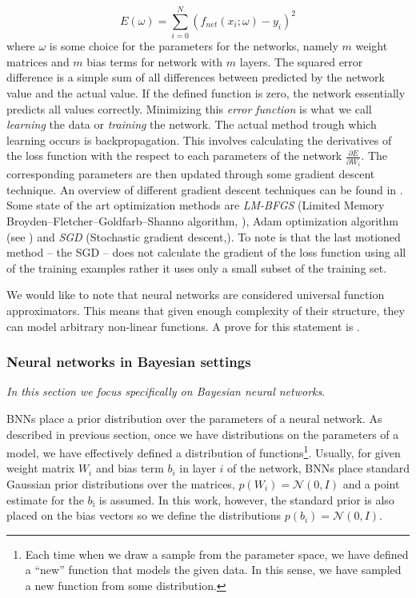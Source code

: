 \documentclass[12pt,a4paper,twoside]{scrartcl}
\numberwithin{equation}{section}
\begin{document}
\begin{equation}
 E(\omega) =  \sum_{i=0}^N (f_{net}(x_i;\omega) - y_i)^2
\end{equation}
where \(\omega\) is some choice for the parameters for the networks, namely \(m\) weight matrices and \(m\) bias terms for network with \(m\) layers. The squared error difference is a simple sum of all differences between predicted by the network value and the actual value. If the defined function is zero, the network essentially predicts all values correctly. Minimizing this \emph{error function} is what we call \emph{learning} the data or \emph{training} the network. The actual method trough which learning occurs is backpropagation. This involves calculating the derivatives of the loss function with the respect to each parameters of the network \(\frac{\partial E}{\partial W_i }\). The corresponding parameters are then updated through some gradient descent technique. An overview of different gradient descent techniques can be found in \cite{ruder2016}. Some state of the art optimization methods are \emph{LM-BFGS} (Limited Memory Broyden–Fletcher–Goldfarb–Shanno algorithm, \cite{byrd1995}), Adam optimization algorithm (see \cite{kingma2014}) and \emph{SGD} (Stochastic gradient descent,\cite{robbins1951}). To note is that the last motioned method -- the SGD -- does not calculate the gradient of the loss function using all of the training examples rather it uses only a small subset of the training set.

We would like to note that neural networks are considered universal function approximators. This means that given enough complexity of their structure, they can model arbitrary non-linear functions. A prove for this statement is \cite{hornik1989}.
\subsubsection{Neural networks in Bayesian settings}\label{sec:nn-in-bayesian}
\noindent\emph{In this section we focus specifically on Bayesian neural networks}.

BNNs place a prior distribution over the parameters of a neural network. As described in previous section, once we have distributions on the parameters of a model, we have effectively defined a distribution of functions\footnote{Each time when we draw a sample from the parameter space, we have defined a ``new'' function that models the given data. In this sense, we have sampled a new function from some distribution.}. Usually, for given weight matrix \(W_i\) and bias term \(b_i\) in layer \(i\) of the network, BNNs place standard Gaussian prior distributions over the matrices, \(p(W_i)=\mathcal{N}(0,I)\) and a point estimate for the \(b_{\text{i}}\) is assumed. In this work, however, the standard prior is also placed on the bias vectors so we define the distributions \(p(b_i)=\mathcal{N}(0,I)\).
\end{document}
